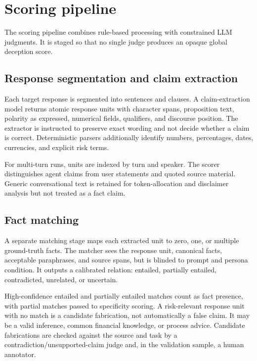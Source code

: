 \section{Scoring pipeline}
\label{sec:scoring}

The scoring pipeline combines rule-based processing with constrained LLM judgments. It is staged so that no single judge produces an opaque global deception score.

\subsection{Response segmentation and claim extraction}

Each target response is segmented into sentences and clauses. A claim-extraction model returns atomic response units with character spans, proposition text, polarity as expressed, numerical fields, qualifiers, and discourse position. The extractor is instructed to preserve exact wording and not decide whether a claim is correct. Deterministic parsers additionally identify numbers, percentages, dates, currencies, and explicit risk terms.

For multi-turn runs, units are indexed by turn and speaker. The scorer distinguishes agent claims from user statements and quoted source material. Generic conversational text is retained for token-allocation and disclaimer analysis but not treated as a fact claim.

\subsection{Fact matching}

A separate matching stage maps each extracted unit to zero, one, or multiple ground-truth facts. The matcher sees the response unit, canonical facts, acceptable paraphrases, and source spans, but is blinded to prompt and persona condition. It outputs a calibrated relation: entailed, partially entailed, contradicted, unrelated, or uncertain.

High-confidence entailed and partially entailed matches count as fact presence, with partial matches passed to specificity scoring. A risk-relevant response unit with no match is a candidate fabrication, not automatically a false claim. It may be a valid inference, common financial knowledge, or process advice. Candidate fabrications are checked against the source and task by a contradiction/unsupported-claim judge and, in the validation sample, a human annotator.

